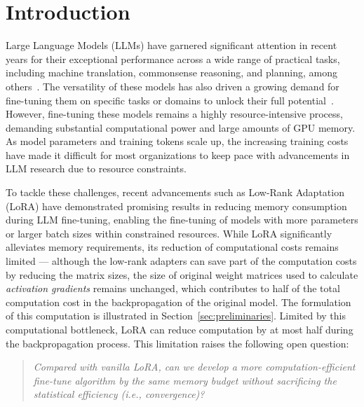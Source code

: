 
\vspace{-1em}
\section{Introduction}

Large Language Models (LLMs) have garnered significant attention in recent years for their exceptional performance across a wide range of practical tasks, including machine translation, commonsense reasoning, and planning, among others~\cite{bommasani2021opportunities}.
The versatility of these models has also driven a growing demand for fine-tuning them on specific tasks or domains to unlock their full potential~\cite{zhang2023instruction,han2024parameter}.
However, fine-tuning these models remains a highly resource-intensive process, demanding substantial computational power and large amounts of GPU memory. As model parameters and training tokens scale up, the increasing training costs have made it difficult for most organizations to keep pace with advancements in LLM research due to resource constraints.

To tackle these challenges, recent advancements such as Low-Rank Adaptation (LoRA) \citep{hu2021lora} have demonstrated promising results in reducing memory consumption during LLM fine-tuning, enabling the fine-tuning of models with more parameters or larger batch sizes within constrained resources. While LoRA significantly alleviates memory requirements, its reduction of computational costs remains limited --- although the low-rank adapters can save part of the computation costs by reducing the matrix sizes, the size of original weight matrices used to calculate \textit{activation gradients} remains unchanged, which contributes to half of the total computation cost in the backpropagation of the original model. The formulation of this computation is illustrated in Section~\ref{sec:preliminaries}. Limited by this computational bottleneck, LoRA can reduce computation by at most half during the backpropagation process. This limitation raises the following open question:
\begin{quote}
    \textit{Compared with vanilla LoRA, can we develop a more computation-efficient fine-tune algorithm by the same memory budget without sacrificing the statistical efficiency (i.e., convergence)?}
\end{quote}


